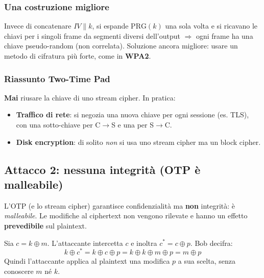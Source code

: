 \subsubsection{Una costruzione migliore}
Invece di concatenare $IV \| k$, si espande $\mathrm{PRG}(k)$ una sola volta e si ricavano le chiavi per i singoli frame da segmenti diversi dell'output $\Rightarrow$ ogni frame ha una chiave pseudo-random (non correlata). Soluzione ancora migliore: usare un metodo di cifratura più forte, come in \textbf{WPA2}.

\subsubsection{Riassunto Two-Time Pad}
\textbf{Mai} riusare la chiave di uno stream cipher. In pratica:
\begin{itemize}
  \item \textbf{Traffico di rete}: si negozia una nuova chiave per ogni sessione (es. TLS), con una sotto-chiave per C$\to$S e una per S$\to$C.
  \item \textbf{Disk encryption}: di solito \emph{non} si usa uno stream cipher ma un block cipher.
\end{itemize}

\subsection{Attacco 2: nessuna integrità (OTP è malleabile)}
L'OTP (e lo stream cipher) garantisce confidenzialità ma \textbf{non} integrità: è \textit{malleabile}. Le modifiche al ciphertext non vengono rilevate e hanno un effetto \textbf{prevedibile} sul plaintext.

Sia $c = k \oplus m$. L'attaccante intercetta $c$ e inoltra $c^* = c \oplus p$. Bob decifra:
\[
  k \oplus c^* = k \oplus c \oplus p = k \oplus k \oplus m \oplus p = m \oplus p
\]
Quindi l'attaccante applica al plaintext una modifica $p$ a sua scelta, senza conoscere $m$ né $k$.



%
